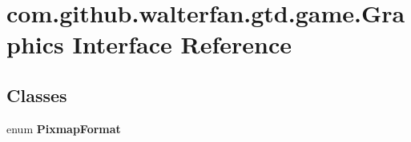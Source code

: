 \hypertarget{interfacecom_1_1github_1_1walterfan_1_1gtd_1_1game_1_1Graphics}{\section{com.\-github.\-walterfan.\-gtd.\-game.\-Graphics Interface Reference}
\label{interfacecom_1_1github_1_1walterfan_1_1gtd_1_1game_1_1Graphics}
}
\subsection*{Classes}
\begin{DoxyCompactItemize}
\item 
enum {\bfseries Pixmap\-Format}
\end{DoxyCompactItemize}
